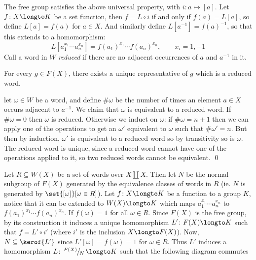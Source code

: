 The free group satisfies the above universal property, with $i\colon a\mapsto[a]$.
Let $f\colon X\longto K$ be a set function, then $f=L\circ i$ if and only if $f(a)=L[a]$, so define $L[a]=f(a)$ for $a\in X$.
And similarly define $L[a^{-1}]=f(a)^{-1}$, so that this extends to a homomorphism:
$$ L[a_1^{x_1}\cdots a_n^{x_n}] = f(a_1)^{x_1}\cdots f(a_n)^{x_n},\qquad x_i=1,-1 $$
Call a word in $W$ {\it reduced} if there are no adjacent occurrences of $a$ and $a^{-1}$ in it.

\bprop

    For every $g\in F(X)$, there exists a unique representative of $g$ which is a reduced word.

\eprop

\Proof let $\omega\in W$ be a word, and define $\#\omega$ be the number of times an element $a\in X$ occurs adjacent to $a^{-1}$.
We claim that $\omega$ is equivalent to a reduced word.
If $\#\omega=0$ then $\omega$ is reduced.
Otherwise we induct on $\omega$: if $\#\omega=n+1$ then we can apply one of the operations to get an $\omega'$ equivalent to $\omega$ such that $\#\omega'=n$.
But then by induction, $\omega'$ is equivalent to a reduced word so by transitivity so is $\omega$.
The reduced word is unique, since a reduced word cannot have one of the operations applied to it, so two reduced words cannot be equivalent.
\qed

Let $R\subseteq W(X)$ be a set of words over $X\coprod X$.
Then let $N$ be the normal subgroup of $F(X)$ generated by the equivalence classes of words in $R$ (ie. $N$ is generated by $\set{[\omega]}[\omega\in R]$).
Let $f\colon X\longto K$ be a function to a group $K$, notice that it can be extended to $W(X)\longto K$ which maps $a_1^{x_1}\cdots a_n^{x_n}$ to $f(a_1)^{x_1}\cdots f(a_n)^{x_n}$.
If $f(\omega)=1$ for all $\omega\in R$.
Since $F(X)$ is the free group, by its construction it induces a unique homomorphism $L'\colon F(X)\longto K$ such that $f=L'\circ i'$ (where $i'$ is the inclusion $X\longto F(X)$).
Now, $N\subseteq\kerof{L'}$ since $L'[\omega]=f(\omega)=1$ for $\omega\in R$.
Thus $L'$ induces a homomorphism $L\colon\slfrac{F(X)}N\longto K$ such that the following diagram commutes

\medskip
\centerline{\def\diagcolwidth{1cm}\def\diagrowheight{.75cm}}

